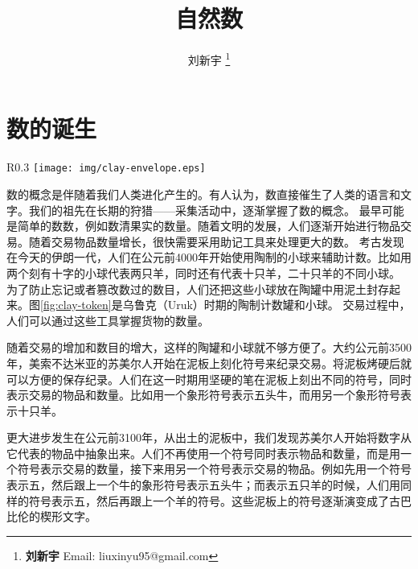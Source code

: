 \documentclass[UTF8]{article}
\begin{document}

\title{自然数}

\author{刘新宇
\thanks{{\bfseries 刘新宇} \newline
  Email: liuxinyu95@gmail.com \newline}
  }

\maketitle
\fi


\section{数的诞生}

\begin{wrapfigure}{R}{0.3\textwidth}
 \centering
 \texttt{[image: img/clay-envelope.eps]}
 \caption{卢浮宫陈列的乌鲁尔时期的计数陶罐和一组计数陶球。}
 \label{fig:clay-token}
\end{wrapfigure}

数的概念是伴随着我们人类进化产生的。有人认为，数直接催生了人类的语言和文字。我们的祖先在长期的狩猎——采集活动中，逐渐掌握了数的概念。
最早可能是简单的数数，例如数清果实的数量。随着文明的发展，人们逐渐开始进行物品交易。随着交易物品数量增长，很快需要采用助记工具来处理更大的数。
考古发现在今天的伊朗一代，人们在公元前4000年开始使用陶制的小球来辅助计数。比如用两个刻有十字的小球代表两只羊，同时还有代表十只羊，二十只羊的不同小球。
为了防止忘记或者篡改数过的数目，人们还把这些小球放在陶罐中用泥土封存起来。图\ref{fig:clay-token}是乌鲁克（Uruk）时期的陶制计数罐和小球\cite{wiki-number}。
交易过程中，人们可以通过这些工具掌握货物的数量\cite{trip-to-number-kindom}。

随着交易的增加和数目的增大，这样的陶罐和小球就不够方便了。大约公元前3500年，美索不达米亚的苏美尔人开始在泥板上刻化符号来纪录交易。将泥板烤硬后就可以方便的保存纪录。人们在这一时期用坚硬的笔在泥板上刻出不同的符号，同时表示交易的物品和数量。比如用一个象形符号表示五头牛，而用另一个象形符号表示十只羊。

更大进步发生在公元前3100年，从出土的泥板中，我们发现苏美尔人开始将数字从它代表的物品中抽象出来。人们不再使用一个符号同时表示物品和数量，而是用一个符号表示交易的数量，接下来用另一个符号表示交易的物品。例如先用一个符号表示五，然后跟上一个牛的象形符号表示五头牛；而表示五只羊的时候，人们用同样的符号表示五，然后再跟上一个羊的符号。这些泥板上的符号逐渐演变成了古巴比伦的楔形文字。
\end{document}
